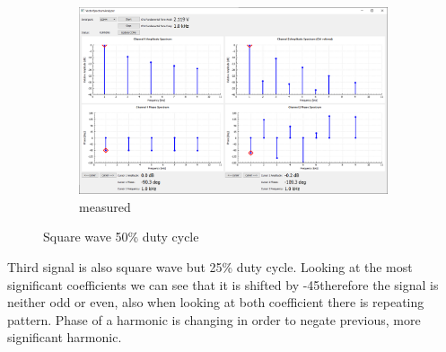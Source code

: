 \documentclass[notitlepage, a4paper, 11pt]{article}
\begin{document}
\begin{figure}[H]
\begin{subfigure}[][][t]{0.28\textwidth}
			\includegraphics[width=\textwidth, trim=10 80 555 100, clip]{../img/Circuit1/dut50}
			\caption{measured}
			\label{fig:meas-signal-b}
		\end{subfigure}
		\caption{Square wave 50\% duty cycle}
		\label{fig:pure-sqr50}
	\end{figure}
	
	Third signal is also square wave but 25\% duty cycle. Looking at the most significant coefficients we can see that it is shifted by -45\degree therefore the signal is neither odd or even, also when looking at both coefficient there is repeating pattern. Phase of a harmonic is changing in order to negate previous, more significant harmonic.
	
\end{document}
